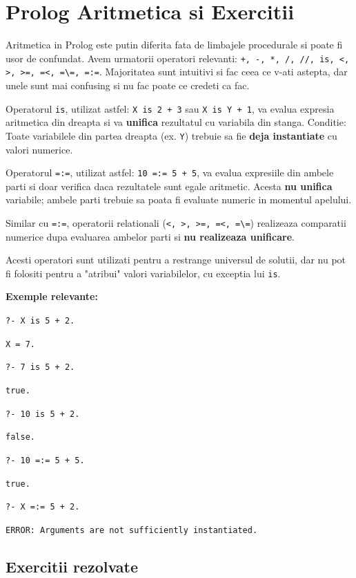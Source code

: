 \section{Prolog Aritmetica si Exercitii}
Aritmetica in Prolog este putin diferita fata de limbajele procedurale si poate fi usor de confundat.
Avem urmatorii operatori relevanti:
\texttt{+, -, *, /, //, is, <, >, >=, =<, =\textbackslash=, =:=}.
Majoritatea sunt intuitivi si fac ceea ce v-ati astepta, dar unele sunt mai confusing si nu fac poate ce credeti ca fac.

Operatorul \texttt{is}, utilizat astfel: \texttt{X is 2 + 3} sau \texttt{X is Y + 1}, va evalua expresia aritmetica din dreapta si va \textbf{unifica} rezultatul cu variabila din stanga. Conditie: Toate variabilele din partea dreapta (ex. \texttt{Y}) trebuie sa fie \textbf{deja instantiate} cu valori numerice.

Operatorul \texttt{=:=}, utilizat astfel: \texttt{10 =:= 5 + 5}, va evalua expresiile din ambele parti si doar verifica daca rezultatele sunt egale aritmetic. Acesta \textbf{nu unifica} variabile; ambele parti trebuie sa poata fi evaluate numeric in momentul apelului.

Similar cu \texttt{=:=}, operatorii relationali (\texttt{<, >, >=, =<, =\textbackslash=}) realizeaza comparatii numerice dupa evaluarea ambelor parti si \textbf{nu realizeaza unificare}.

Acesti operatori sunt utilizati pentru a restrange universul de solutii, dar nu pot fi folositi pentru a "atribui" valori variabilelor, cu exceptia lui \texttt{is}.

\textbf{Exemple relevante:}

\texttt{?- X is 5 + 2.}

\texttt{X = 7.}

\texttt{?- 7 is 5 + 2.}

\texttt{true.}

\texttt{?- 10 is 5 + 2.}

\texttt{false.}

\texttt{?- 10 =:= 5 + 5.}

\texttt{true.}

\texttt{?- X =:= 5 + 2.}

\texttt{ERROR: Arguments are not sufficiently instantiated.}

\subsection*{Exercitii rezolvate}


